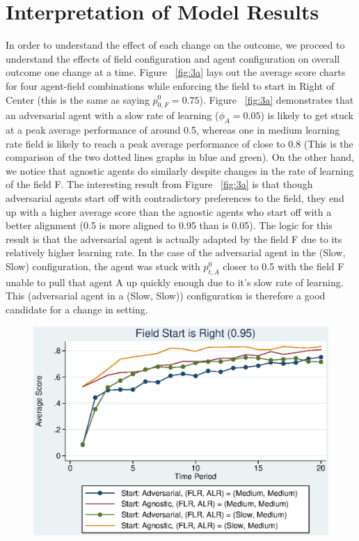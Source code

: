 \documentclass[12pt,letterpaper]{article}
\begin{document}
\section{Interpretation of Model Results}
In order to understand the effect of each change on the outcome, we proceed to understand the effects of field configuration and agent configuration on overall outcome one change at a time. Figure ~\ref{fig:3a} lays out the average score charts for four agent-field combinations while enforcing the field to start in Right of Center (this is the same as saying $p_{0,F}^0 = 0.75$). Figure ~\ref{fig:3a} demonstrates that an adversarial agent with a slow rate of learning ($\phi_A = 0.05$) is likely to get stuck at a peak average performance of around 0.5, whereas one in medium learning rate field is likely to reach a peak average performance of close to 0.8 (This is the comparison of the two dotted lines graphs in blue and green). On the other hand, we notice that agnostic agents do similarly despite changes in the rate of learning of the field F. The interesting result from Figure ~\ref{fig:3a} is that though adversarial agents start off with contradictory preferences to the field, they end up with a higher average score than the agnostic agents who start off with a better alignment (0.5 is more aligned to 0.95 than is 0.05). The logic for this result is that the adversarial agent is actually adapted by the field F due to its relatively higher learning rate. In the case of the adversarial agent in the (Slow, Slow) configuration, the agent was stuck with $p_{t,A}^0$ closer to 0.5 with the field F unable to pull that agent A up quickly enough due to it's slow rate of learning. This (adversarial agent in a (Slow, Slow)) configuration is therefore a good candidate for a change in setting.



\begin{figure}[h]
\begin{centering}
  \caption{}
  \includegraphics[width=\textwidth]{frcmedium3c}
  \label{fig:3c}
\end{centering}
\end{figure}
\end{document}
